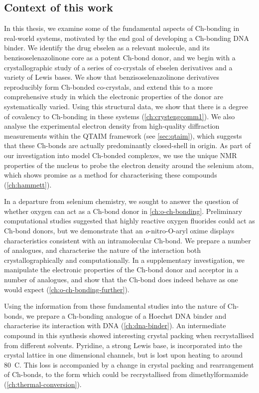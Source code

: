 \begin{refsection}
\section{Context of this work}
In this thesis, we examine some of the fundamental aspects of Ch-bonding in real-world systems, motivated by the end goal of developing a Ch-bonding DNA binder.
We identify the drug ebselen as a relevant molecule, and its benzisoselenazolinone core as a potent Ch-bond donor, and we begin with a crystallographic study of a series of co-crystals of ebselen derivatives and a variety of Lewis bases.
We show that benzisoselenazolinone derivatives reproducibly form Ch-bonded co-crystals, and extend this to a more comprehensive study in which the electronic properties of the donor are systematically varied.
Using this structural data, we show that there is a degree of covalency to Ch-bonding in these systems (\cref{ch:crystengcomm1}).
We also analyse the experimental electron density from high-quality diffraction measurements within the QTAIM framework (see \cref{sec:qtaim}), which suggests that these Ch-bonds are actually predominantly closed-shell in origin.
As part of our investigation into model Ch-bonded complexes, we use the unique NMR properties of the  nucleus to probe the electron density around the selenium atom, which shows promise as a method for characterising these compounds (\cref{ch:hammett}).

In a departure from selenium chemistry, we sought to answer the question of whether oxygen can act as a Ch-bond donor in \cref{ch:o-ch-bonding}.
Preliminary computational studies suggested that highly reactive oxygen fluorides could act as Ch-bond donors\autocite{Varadwaj2019a}, but we demonstrate that an \textit{o}-nitro-O-aryl oxime displays characteristics consistent with an intramolecular  Ch-bond.
We prepare a number of analogues, and characterise the nature of the  interaction both crystallographically and computationally.
In a supplementary investigation, we manipulate the electronic properties of the Ch-bond donor and acceptor in a number of analogues, and show that the Ch-bond does indeed behave as one would expect (\cref{ch:o-ch-bonding-further}).

Using the information from these fundamental studies into the nature of Ch-bonds, we prepare a Ch-bonding analogue of a Hoechst DNA binder and characterise its interaction with DNA (\cref{ch:dna-binder}).\@
An intermediate compound in this synthesis showed interesting crystal packing when recrystallised from different solvents.
Pyridine, a strong Lewis base, is incorporated into the crystal lattice in one dimensional channels, but is lost upon heating to around 80~\degree{}C.
This loss is accompanied by a change in crystal packing and rearrangement of Ch-bonds, to the form which could be recrystallised from dimethylformamide (\cref{ch:thermal-conversion}).


\end{refsection}
